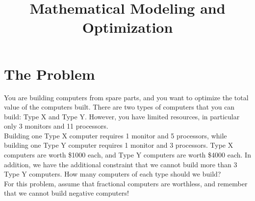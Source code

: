 \documentclass[12pt]{article}
\begin{document}
\title{Mathematical Modeling and Optimization}

\maketitle

\section{The Problem}

You are building computers from spare parts, and you want to optimize the total value of the
computers built.  There are two types of computers that you can build: Type X and Type Y.  However,
you have limited resources, in particular only 3 monitors and 11 processors.  \\

Building one Type X computer requires 1 monitor and 5 processors, while building one Type Y computer
requires 1 monitor and 3 processors.  Type X computers are worth \$1000 each, and Type Y computers are worth
\$4000 each.  In addition, we have the additional constraint that we cannot build more than 3 Type Y computers.  
How many computers of each type should we build? \\

For this problem, assume that fractional computers are worthless, and remember that we cannot build negative computers!  
\end{document}
